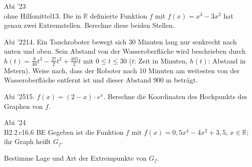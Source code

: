 \documentclass[11pt]{article}
\begin{document}
\pfgruppe{}
\begin{pfaufg}{Abi ’23\\ohne Hilfsmittel}{13.}{}
Die in $\mathbb{R}$ definierte Funktion $f$ mit $f(x) = x^3 - 3x^2$ hat genau zwei Extremstellen. Berechne diese beiden Stellen.
\end{pfaufg}
\begin{pfaufg}{Abi ’22}{14.}{}
Ein Tauchroboter bewegt sich 30 Minuten lang nur senkrecht nach unten und oben. Sein Abstand von der Wasseroberfläche wird beschrieben durch $h(t) = \tfrac{9}{40}t^3 - \tfrac{27}{2}t^2 + \tfrac{405}{2}t$ mit $0 \le t \le 30$ ($t$: Zeit in Minuten, $h(t)$: Abstand in Metern). Weise nach, dass der Roboter nach 10 Minuten am weitesten von der Wasseroberfläche entfernt ist und dieser Abstand 900 m beträgt.
\par\smallskip\noindent{}
\end{pfaufg}
\begin{pfaufg}{Abi ’25}{15.}{}
$f(x) = (2 - x)\cdot e^x$. Berechne die Koordinaten des Hochpunkts des Graphen von $f$.
\end{pfaufg}

\begin{pfaufg}{Abi ’24\\B2.2\,c}{16.}{6 BE}
Gegeben ist die Funktion $f$ mit $f(x) = 0{,}5x^4 - 4x^2 + 3{,}5$, $x \in \mathbb{R}$; ihr Graph heißt $G_f$.
\par\smallskip
Bestimme Lage und Art der Extrempunkte von $G_f$.
\end{pfaufg}
\end{document}
